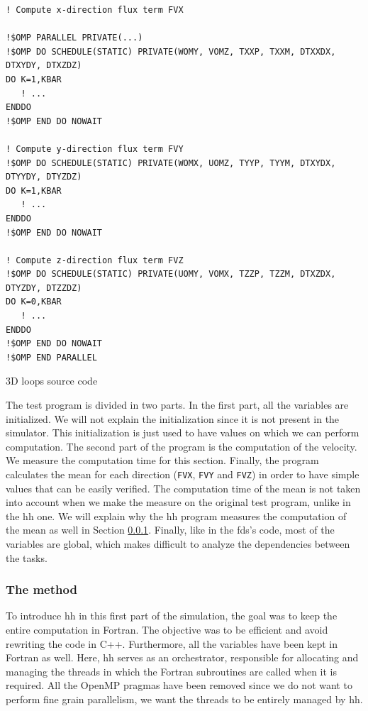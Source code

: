 \begin{listing}[ht!]
\begin{verbatim}
! Compute x-direction flux term FVX

!$OMP PARALLEL PRIVATE(...)
!$OMP DO SCHEDULE(STATIC) PRIVATE(WOMY, VOMZ, TXXP, TXXM, DTXXDX, DTXYDY, DTXZDZ)
DO K=1,KBAR
   ! ...
ENDDO
!$OMP END DO NOWAIT

! Compute y-direction flux term FVY
!$OMP DO SCHEDULE(STATIC) PRIVATE(WOMX, UOMZ, TYYP, TYYM, DTXYDX, DTYYDY, DTYZDZ)
DO K=1,KBAR
   ! ...
ENDDO
!$OMP END DO NOWAIT

! Compute z-direction flux term FVZ
!$OMP DO SCHEDULE(STATIC) PRIVATE(UOMY, VOMX, TZZP, TZZM, DTXZDX, DTYZDY, DTZZDZ)
DO K=0,KBAR
   ! ...
ENDDO
!$OMP END DO NOWAIT
!$OMP END PARALLEL
\end{verbatim}
\caption{3D loops source code}
\label{lst:3Dloopscode}
\end{listing}

The test program is divided in two parts. In the first part, all the variables
are initialized. We will not explain the initialization since it is not present
in the simulator. This initialization is just used to have values on which we
can perform computation. The second part of the program is the computation of
the velocity. We measure the computation time for this section. Finally, the
program calculates the mean for each direction (\texttt{FVX}, \texttt{FVY} and
\texttt{FVZ}) in order to have simple values that can be easily verified. The
computation time of the mean is not taken into account when we make the measure
on the original test program, unlike in the \gls{hh} one. We will explain why
the \gls{hh} program measures the computation of the mean as well in Section
\ref{sec:3Dloopsmethod}. Finally, like in the \gls{fds}'s code, most of the
variables are global, which makes difficult to analyze the dependencies between
the tasks.

\subsubsection{The method}
\label{sec:3Dloopsmethod}

To introduce \gls{hh} in this first part of the simulation, the goal was to keep
the entire computation in Fortran. The objective was to be efficient and avoid
rewriting the code in C++. Furthermore, all the variables have been kept in
Fortran as well. Here, \gls{hh} serves as an orchestrator, responsible for
allocating and managing the threads in which the Fortran subroutines are called
when it is required. All the OpenMP pragmas have been removed since we do not
want to perform fine grain parallelism, we want the threads to be entirely
managed by \gls{hh}.

